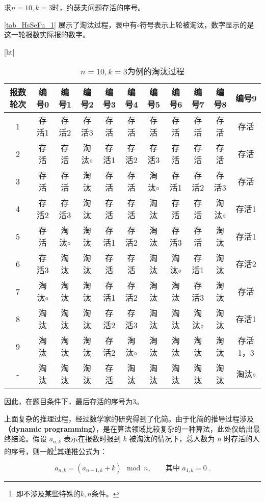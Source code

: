 \begin{example}{求$n=10,k=3$时，约瑟夫问题存活的序号。}

\autoref{tab_HsSeFu_1} 展示了淘汰过程，表中有$\circ$符号表示上轮被淘汰，数字显示的是这一轮报数实际报的数字。

\begin{table}\label{tab_HsSeFu_1}[ht]
\centering
\caption{$n=10,k=3$为例的淘汰过程}\label{tab_HsSeFu1}
\begin{tabular}{|c|c|c|c|c|c|c|c|c|c|c|}
\hline
报数轮次 & 编号0& 编号1& 编号2 & 编号3 & 编号4& 编号5 & 编号6& 编号7 & 编号8& 编号9\\
\hline
1 & 存活1 & 存活2 &存活3 &存活 &存活 &存活 &存活 &存活 &存活 &存活\\
\hline
2 & 存活 & 存活 &淘汰$\circ$ &存活1 &存活2 &存活3 &存活 &存活 &存活 &存活\\
\hline
3 & 存活 & 存活 &淘汰 &存活 &存活 &淘汰$\circ$ &存活1 &存活2 &存活3 &存活\\
\hline
4 & 存活2 & 存活3 &淘汰 &存活 &存活 &淘汰 &存活 &存活 &淘汰$\circ$ &存活1\\
\hline
5 & 存活 & 淘汰$\circ$ &淘汰 &存活1 &存活2 &淘汰 &存活3 &存活 &淘汰 &存活1\\
\hline
6 & 存活3 & 淘汰 &淘汰 &存活 &存活&淘汰 &淘汰$\circ$ &存活1&淘汰 &存活2\\
\hline
7 & 淘汰$\circ$ & 淘汰 &淘汰 &存活1 &存活2 &淘汰 &淘汰 &存活3 &淘汰 &存活\\
\hline
8 & 淘汰 & 淘汰 &淘汰 &存活2 &存活3 &淘汰 &淘汰 &淘汰$\circ$ &淘汰 &存活1\\
\hline
9 & 淘汰 & 淘汰 &淘汰 &存活2 &淘汰$\circ$ &淘汰 &淘汰 &淘汰 &淘汰 &存活1，3\\
\hline
- & 淘汰 & 淘汰 &淘汰 &存活 &淘汰 &淘汰 &淘汰 &淘汰 &淘汰 & 淘汰$\circ$ \\
\hline
\end{tabular}
\end{table}

因此，在题目条件下，最后存活的序号为3。
\end{example}

上面复杂的推理过程，经过数学家的研究得到了化简。由于化简的推导过程涉及\textbf{（dynamic programming）}，是在算法领域比较复杂的一种算法，此处仅给出最终结论。假设 $a_{n,k}$ 表示在报数时报到 $k$ 被淘汰的情况下，总人数为 $n$ 时存活的人的序号，则一般\footnote{即不涉及某些特殊的$k,n$条件。}其递推公式为：

\begin{equation}
a_{n,k} = (a_{n-1,k} + k) \mod n, \qquad \text{其中 } a_{1,k} = 0~.
\end{equation}

